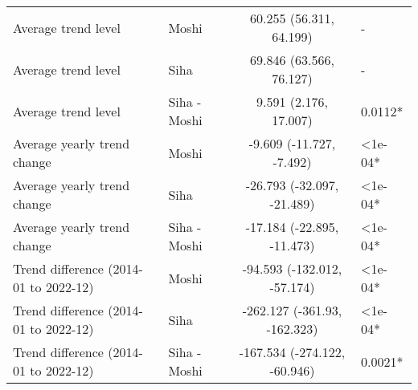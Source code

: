 \begin{longtable}{l|lcl}
\midrule\addlinespace[2.5pt]
\multicolumn{4}{l}{Vector-borne Infections} \\[2.5pt] 
\midrule\addlinespace[2.5pt]
Average trend level & Moshi & 60.255 (56.311, 64.199) & - \\ 
Average trend level & Siha & 69.846 (63.566, 76.127) & - \\ 
Average trend level & Siha - Moshi & 9.591 (2.176, 17.007) & 0.0112* \\ 
Average yearly trend change & Moshi & -9.609 (-11.727, -7.492) & <1e-04* \\ 
Average yearly trend change & Siha & -26.793 (-32.097, -21.489) & <1e-04* \\ 
Average yearly trend change & Siha - Moshi & -17.184 (-22.895, -11.473) & <1e-04* \\ 
Trend difference (2014-01 to 2022-12) & Moshi & -94.593 (-132.012, -57.174) & <1e-04* \\ 
Trend difference (2014-01 to 2022-12) & Siha & -262.127 (-361.93, -162.323) & <1e-04* \\ 
Trend difference (2014-01 to 2022-12) & Siha - Moshi & -167.534 (-274.122, -60.946) & 0.0021* \\ 
\bottomrule
\end{longtable}
\endgroup

